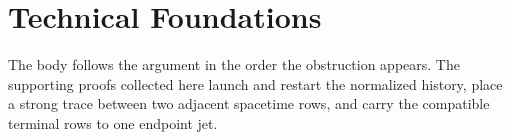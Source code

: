 \section{Technical Foundations}\label{app:TechnicalFoundations}

The body follows the argument in the order the obstruction appears.  The
supporting proofs collected here launch and restart the normalized history,
place a strong trace between two adjacent spacetime rows, and carry the
compatible terminal rows to one endpoint jet.





